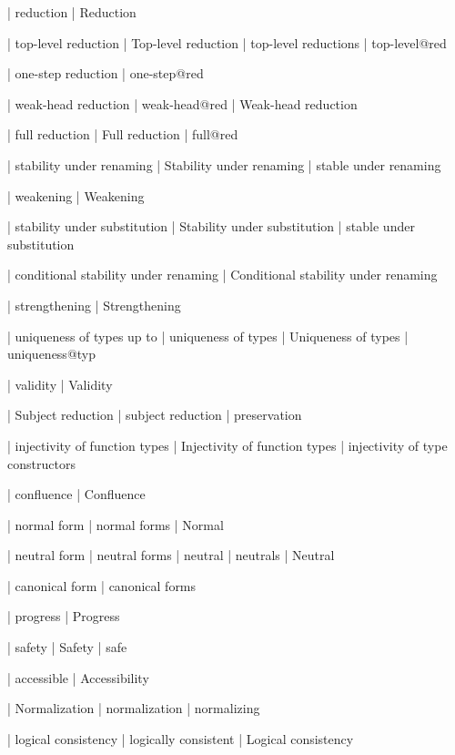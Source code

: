  | reduction
  | Reduction

  | top-level reduction
  | Top-level reduction
  | top-level reductions
  | top-level@red

  | one-step reduction
  | one-step@red

  | weak-head reduction
  | weak-head@red
  | Weak-head reduction

  | full reduction
  | Full reduction
  | full@red

  | stability under renaming
  | Stability under renaming
  | stable under renaming

  | weakening
  | Weakening

  | stability under substitution
  | Stability under substitution
  | stable under substitution

  | conditional stability under renaming
  | Conditional stability under renaming


  | strengthening
  | Strengthening

  | uniqueness of types up to
  | uniqueness of types
  | Uniqueness of types
  | uniqueness@typ

  | validity
  | Validity

  | Subject reduction
  | subject reduction
  | preservation

  | injectivity of function types
  | Injectivity of function types
  | injectivity of type constructors

  | confluence
  | Confluence

  | normal form
  | normal forms
  | Normal

  | neutral form
  | neutral forms
  | neutral
  | neutrals
  | Neutral

  | canonical form
  | canonical forms

  | progress
  | Progress

  | safety
  | Safety
  | safe

  | accessible
  | Accessibility

  | Normalization
  | normalization
  | normalizing

  | logical consistency
  | logically consistent
  | Logical consistency

